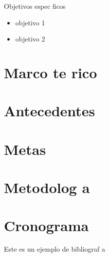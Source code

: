\documentclass{article}
\begin{document}
\vspace{5 cm}
\Large{Objetivos espec ficos}
\begin{itemize}
 \item objetivo 1
 \item objetivo 2
\end{itemize}

\chapter{Marco te rico}

\chapter{Antecedentes}

\chapter{Metas}

\chapter{Metodolog a}

\chapter{Cronograma}

Este es un ejemplo de bibliograf a \cite{OpticaPochi}

\newpage
\end{document}
